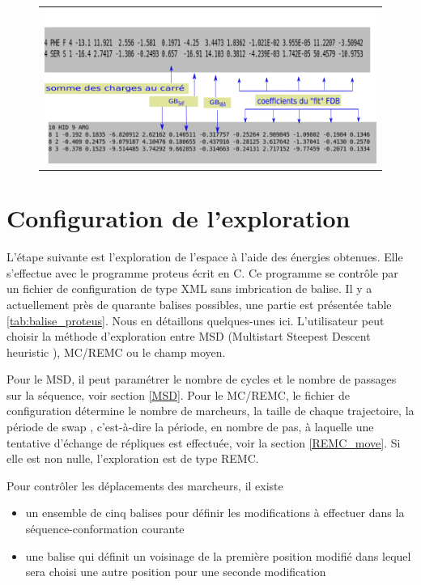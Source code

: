    \begin{figure}[!htbp]
     \centering
     \begin{tabular}{c}
       \includegraphics[width=14cm]{figure/inputenerGB.png} 
     \end{tabular}     
     \caption{}
\label{fig:GBenerfile}
   \end{figure}
   

\section{Configuration de l'exploration}
L'étape suivante est l'exploration de l'espace à l'aide des énergies obtenues. Elle s'effectue avec le programme proteus écrit en C. Ce programme se contrôle par un fichier de configuration de type XML sans imbrication de balise. Il y a actuellement près de quarante balises possibles, une partie est présentée table \ref{tab:balise_proteus}. Nous en détaillons quelques-unes ici. L'utilisateur peut choisir la méthode d'exploration entre MSD (\og Multistart Steepest Descent heuristic \fg), MC/REMC ou le champ moyen.

Pour le MSD, il peut paramétrer le nombre de cycles et le nombre de passages sur la séquence, voir section \vref{MSD}.
Pour le MC/REMC, le fichier de configuration détermine le nombre de marcheurs, la taille de chaque trajectoire, la période de \og swap \fg, c'est-à-dire la période, en nombre de pas, à laquelle une tentative d'échange de répliques est effectuée, voir la section \vref{REMC_move}. Si elle est non nulle, l'exploration est de type REMC.

Pour contrôler les déplacements des marcheurs, il existe 
\begin{itemize}
\item un ensemble de cinq  balises pour définir les modifications à effectuer dans la séquence-conformation courante
\item une balise qui définit un voisinage de la première position modifié dans lequel sera choisi une autre position pour une seconde modification
\end{itemize}

